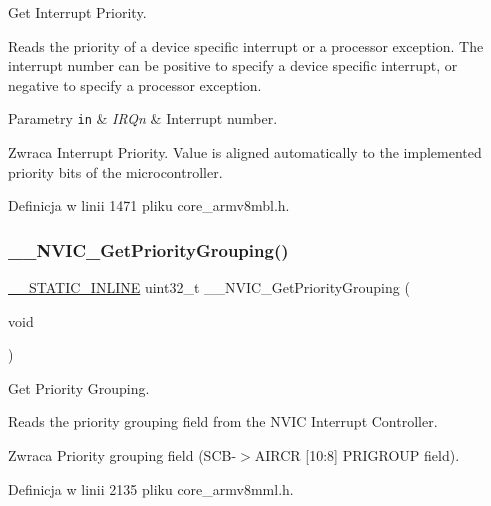 Get Interrupt Priority. 

Reads the priority of a device specific interrupt or a processor exception. The interrupt number can be positive to specify a device specific interrupt, or negative to specify a processor exception. 
\begin{DoxyParams}[1]{Parametry}
\mbox{\tt in}  & {\em I\+R\+Qn} & Interrupt number. \\
\hline
\end{DoxyParams}
\begin{DoxyReturn}{Zwraca}
Interrupt Priority. Value is aligned automatically to the implemented priority bits of the microcontroller. 
\end{DoxyReturn}


Definicja w linii 1471 pliku core\+\_\+armv8mbl.\+h.

\mbox{\label{group___c_m_s_i_s___core___n_v_i_c_functions_ga9b894af672df4373eb637f8288845c05}} 
\subsubsection{\texorpdfstring{\+\_\+\+\_\+\+N\+V\+I\+C\+\_\+\+Get\+Priority\+Grouping()}{\_\_NVIC\_GetPriorityGrouping()}}
{\footnotesize\ttfamily \hyperlink{cmsis__iccarm_8h_aba87361bfad2ae52cfe2f40c1a1dbf9c}{\+\_\+\+\_\+\+S\+T\+A\+T\+I\+C\+\_\+\+I\+N\+L\+I\+NE} uint32\+\_\+t \+\_\+\+\_\+\+N\+V\+I\+C\+\_\+\+Get\+Priority\+Grouping (\begin{DoxyParamCaption}\item[{void}]{ }\end{DoxyParamCaption})}



Get Priority Grouping. 

Reads the priority grouping field from the N\+V\+IC Interrupt Controller. \begin{DoxyReturn}{Zwraca}
Priority grouping field (S\+C\+B-\/$>$A\+I\+R\+CR \mbox{[}10\+:8\mbox{]} P\+R\+I\+G\+R\+O\+UP field). 
\end{DoxyReturn}


Definicja w linii 2135 pliku core\+\_\+armv8mml.\+h.


